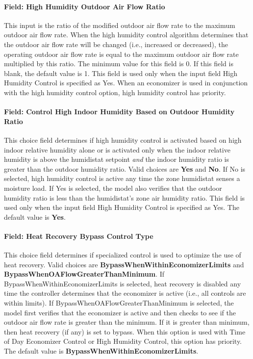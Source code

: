 \paragraph{Field: High Humidity Outdoor Air Flow Ratio}\label{field-high-humidity-outdoor-air-flow-ratio}

This input is the ratio of the modified outdoor air flow rate to the maximum outdoor air flow rate. When the high humidity control algorithm determines that the outdoor air flow rate will be changed (i.e., increased or decreased), the operating outdoor air flow rate is equal to the maximum outdoor air flow rate multiplied by this ratio. The minimum value for this field is 0. If this field is blank, the default value is 1. This field is used only when the input field High Humidity Control is specified as Yes. When an economizer is used in conjunction with the high humidity control option, high humidity control has priority.

\paragraph{Field: Control High Indoor Humidity Based on Outdoor Humidity Ratio}\label{field-control-high-indoor-humidity-based-on-outdoor-humidity-ratio}

This choice field determines if high humidity control is activated based on high indoor relative humidity alone or is activated only when the indoor relative humidity is above the humidistat setpoint \emph{and} the indoor humidity ratio is greater than the outdoor humidity ratio. Valid choices are \textbf{Yes} and \textbf{No}. If No is selected, high humidity control is active any time the zone humidistat senses a moisture load. If Yes is selected, the model also verifies that the outdoor humidity ratio is less than the humidistat's zone air humidity ratio. This field is used only when the input field High Humidity Control is specified as Yes. The default value is \textbf{Yes}.

\paragraph{Field: Heat Recovery Bypass Control Type}\label{field-heat-recovery-bypass-control-type}

This choice field determines if specialized control is used to optimize the use of heat recovery. Valid choices are \textbf{BypassWhenWithinEconomizerLimits} and \textbf{BypassWhenOAFlowGreaterThanMinimum}. If BypassWhenWithinEconomizerLimits is selected, heat recovery is disabled any time the controller determines that the economizer is active (i.e., all controls are within limits). If BypassWhenOAFlowGreaterThanMinimum is selected, the model first verifies that the economizer is active and then checks to see if the outdoor air flow rate is greater than the minimum. If it is greater than minimum, then heat recovery (if any) is set to bypass. When this option is used with Time of Day Economizer Control or High Humidity Control, this option has priority. The default value is \textbf{BypassWhenWithinEconomizerLimits}.

